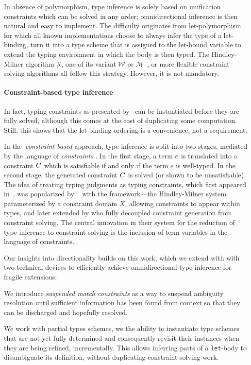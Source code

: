 \documentclass[acmsmall,screen,nonacm]{acmart}
\begin{document}
In absence of polymorphism, type inference is solely based on unification
constraints which can be solved in any order; omnidirectional inference is
then natural and easy to implement.  The difficulty originates from \ML
let-polymorphism for which all known implementations choose to always infer
the type of a let-binding, turn it into a type scheme that is assigned to
the let-bound variable to extend the typing environment in which the body is
then typed. The Hindley-Milner algorithm $\mathcal{J}$, one of its variant
$\mathcal{W}$ or $\mathcal{M}$~\cite {Lee_Yi/algoM@toplas1998}, or more
flexible constraint solving algorithms all follow this strategy.
However, it is not mandatory.

\paragraph {Constraint-based type inference}

In fact, typing constraints as presented by~\citet {Pottier-Remy/emlti} can
be instantiated before they are fully solved, although this comes at the
cost of duplicating some computation.  Still, this shows that the
let-binding ordering is a convenience, not a requirement.

In the~\textit{constraint-based} approach, type inference
is split into two stages, mediated by the language of \textit{constraints}
\citep{TODO}.  In the first stage, a term $e$ is translated into a constraint
$C$ which is satisfiable if and only if the term $e$ is well-typed. In the
second stage, the generated constraint $C$ is solved (or shown to be
unsatisfiable).
%
The idea of treating typing judgments as typing constraints, which first
appeared in~\cite{Remy/mleth,Remy/thesis}, was popularized by ~\citet
{Odersky-Sulzmann-Wehr@tpos} with the \HMX framework---the Hindley-Milner
system parameterized by a constraint domain $X$, allowing constraints to
appear within types, and later extended by \citet{Pottier-Remy/emlti} who
fully decoupled constraint generation from constraint solving.  The central
innovation in their system for the reduction of type inference to constraint
solving is the inclusion of term variables in the language of constraints.

Our insights into directionality builds on this work, which we extend with
with two technical devices to efficiently achieve omnidirectional type
inference for fragile \ML extensions:
\begin{enumerate*}
\item
  We introduce \emph{suspended match constraints} as a way to suspend
  ambiguity resolution until sufficient information has been found from
  context so that they can be discharged and hopefully resolved.
\item
  We work with partial types schemes, \ie we the ability to instantiate type
  schemes that are not yet fully determined and consequently revisit their
  instances when they are being refined, incrementally. This allows
  inferring parts of a \texttt{let}-body to disambiguate its definition,
  without duplicating constraint-solving work.
\end{enumerate*}
\end{document}
